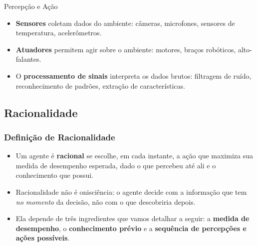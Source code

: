 \documentclass{beamer}
\begin{document}
\begin{frame}{Percepção e Ação}
\footnotesize
    \begin{itemize}
        \item \textbf{Sensores} coletam dados do ambiente: câmeras, microfones, sensores de temperatura, acelerômetros.
        \item \textbf{Atuadores} permitem agir sobre o ambiente: motores, braços robóticos, alto-falantes.
        \item O \textbf{processamento de sinais} interpreta os dados brutos: filtragem de ruído, reconhecimento de padrões, extração de características.
    \end{itemize}

    \begin{center}
    \end{center}
\end{frame}


\subsection{Racionalidade}
\begin{frame}
\frametitle{Definição de Racionalidade}
\begin{itemize}
    \item Um agente é \textbf{racional} se escolhe, em cada instante, a ação que maximiza sua medida de desempenho esperada, dado o que percebeu até ali e o conhecimento que possui.
    \item Racionalidade não é onisciência: o agente decide com a informação que tem \textit{no momento} da decisão, não com o que descobriria depois.
    \item Ela depende de três ingredientes que vamos detalhar a seguir: a \textbf{medida de desempenho}, o \textbf{conhecimento prévio} e a \textbf{sequência de percepções e ações possíveis}.
\end{itemize}
\end{frame}
\end{document}
